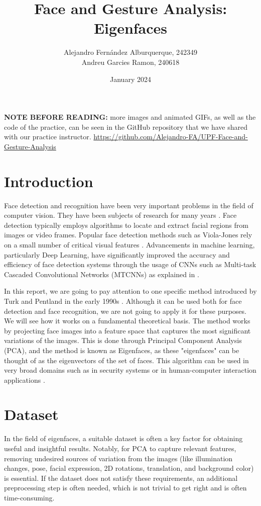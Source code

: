 \documentclass{article}
\begin{document}
\title{Face and Gesture Analysis: Eigenfaces}
\author{Alejandro Fernández Alburquerque, 242349 \\ Andreu Garcies Ramon, 240618}
\date{January 2024}

\maketitle

\textbf{NOTE BEFORE READING:} more images and animated GIFs, as well as the code of the practice, can be seen in the GitHub repository that we have shared with our practice instructor. \url{https://github.com/Alejandro-FA/UPF-Face-and-Gesture-Analysis}

\section{Introduction}
Face detection and recognition have been very important problems in the field of computer vision. They have been subjects of research for many years \cite{adjabi-2020}. Face detection typically employs algorithms to locate and extract facial regions from images or video frames. Popular face detection methods such as Viola-Jones rely on a small number of critical visual features \cite{viola-2004}. Advancements in machine learning, particularly Deep Learning, have significantly improved the accuracy and efficiency of face detection systems through the usage of CNNs such as Multi-task Cascaded Convolutional Networks (MTCNNs) as explained in \cite{xiang-2017}.

In this report, we are going to pay attention to one specific method introduced by Turk and Pentland in the early 1990s \cite{turk-1991}. Although it can be used both for face detection and face recognition, we are not going to apply it for these purposes. We will see how it works on a fundamental theoretical basis. The method works by projecting face images into a feature space that captures the most significant variations of the images. This is done through Principal Component Analysis (PCA), and the method is known as Eigenfaces, as these "eigenfaces" can be thought of as the eigenvectors of the set of faces. This algorithm can be used in very broad domains such as in security systems or in human-computer interaction applications \cite{rodavia-2016, ramadhani-2017}.

\section{Dataset}\label{dataset_section}
In the field of eigenfaces, a suitable dataset is often a key factor for obtaining useful and insightful results. Notably, for PCA to capture relevant features, removing undesired sources of variation from the images (like illumination changes, pose, facial expression, 2D rotations, translation, and background color) is essential. If the dataset does not satisfy these requirements, an additional preprocessing step is often needed, which is not trivial to get right and is often time-consuming.
\end{document}
